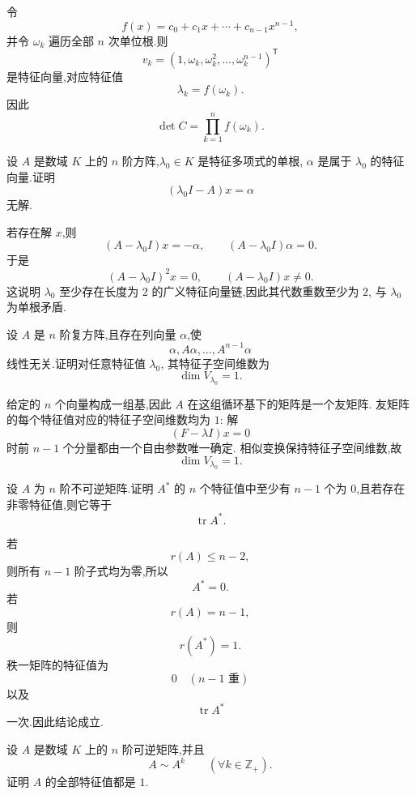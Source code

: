 \begin{solution}
令
\[
f(x)=c_0+c_1x+\cdots+c_{n-1}x^{n-1},
\]
并令 $\omega_k$ 遍历全部 $n$ 次单位根.则
\[
v_k=
(1,\omega_k,\omega_k^2,\ldots,\omega_k^{n-1})^{\mathsf T}
\]
是特征向量,对应特征值
\[
\boxed{\lambda_k=f(\omega_k)}.
\]
因此
\[
\boxed{
\det C
=
\prod\limits_{k=1}^{n}f(\omega_k).
}
\]
\end{solution}


\begin{example}
设 $A$ 是数域 $K$ 上的 $n$ 阶方阵,$\lambda_0\in K$ 是特征多项式的单根,
$\alpha$ 是属于 $\lambda_0$ 的特征向量.证明
\[
(\lambda_0I-A)x=\alpha
\]
无解.
\end{example}
\exampleblank

\begin{solution}
若存在解 $x$,则
\[
(A-\lambda_0I)x=-\alpha,
\qquad
(A-\lambda_0I)\alpha=0.
\]
于是
\[
(A-\lambda_0I)^2x=0,
\qquad
(A-\lambda_0I)x\neq0.
\]
这说明 $\lambda_0$ 至少存在长度为 $2$ 的广义特征向量链,因此其代数重数至少为 $2$,
与 $\lambda_0$ 为单根矛盾.
\end{solution}


\begin{example}
设 $A$ 是 $n$ 阶复方阵,且存在列向量 $\alpha$,使
\[
\alpha,A\alpha,\ldots,A^{n-1}\alpha
\]
线性无关.证明对任意特征值 $\lambda_0$,
其特征子空间维数为
\[
\dim V_{\lambda_0}=1.
\]
\end{example}
\exampleblank

\begin{solution}
给定的 $n$ 个向量构成一组基,因此 $A$ 在这组循环基下的矩阵是一个友矩阵.
友矩阵的每个特征值对应的特征子空间维数均为 $1$:
解
\[
(F-\lambda I)x=0
\]
时前 $n-1$ 个分量都由一个自由参数唯一确定.
相似变换保持特征子空间维数,故
\[
\boxed{\dim V_{\lambda_0}=1}.
\]
\end{solution}


\begin{example}
设 $A$ 为 $n$ 阶不可逆矩阵.证明 $A^*$ 的 $n$ 个特征值中至少有
$n-1$ 个为 $0$,且若存在非零特征值,则它等于
\[
\operatorname{tr}A^*.
\]
\end{example}
\exampleblank

\begin{solution}
若
\[
r(A)\leq n-2,
\]
则所有 $n-1$ 阶子式均为零,所以
\[
A^*=0.
\]
若
\[
r(A)=n-1,
\]
则
\[
r(A^*)=1.
\]
秩一矩阵的特征值为
\[
0\quad(n-1\text{ 重})
\]
以及
\[
\operatorname{tr}A^*
\]
一次.因此结论成立.
\end{solution}


\begin{example}
设 $A$ 是数域 $K$ 上的 $n$ 阶可逆矩阵,并且
\[
A\sim A^k
\qquad
(\forall k\in\mathbb{Z}_+).
\]
证明 $A$ 的全部特征值都是 $1$.
\end{example}
\exampleblank

